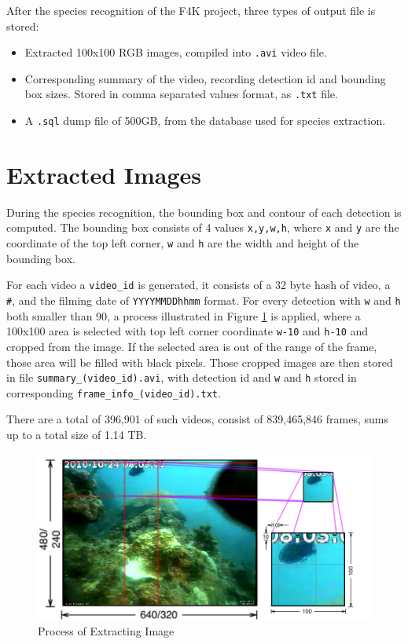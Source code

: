 \documentclass[bsc,logo,twoside,fullspacing,parskip]{infthesis}
\begin{document}
After the species recognition of the F4K project, three types of output file is stored:
\begin{itemize}
\item
Extracted 100x100 RGB images, compiled into {\tt .avi} video file.
\item
Corresponding summary of the video, recording detection id and bounding box sizes. Stored in comma separated values format, as {\tt .txt} file.
\item
A {\tt .sql} dump file of 500GB, from the database used for species extraction.
\end{itemize}

\section{Extracted Images}
\label{sec:summaries}

During the species recognition, the bounding box and contour of each detection is computed.
The bounding box consists of 4 values {\tt x,y,w,h}, where {\tt x} and {\tt y} are the coordinate of the top left corner, {\tt w} and {\tt h} are the width and height of the bounding box. 

For each video a {\tt video\_id} is generated, it consists of a 32 byte hash of video, a {\tt \#}, and the filming date of {\tt YYYYMMDDhhmm} format. 
For every detection with {\tt w} and {\tt h} both smaller than 90, a process illustrated in Figure \ref{fig:extraction} is applied, where a 100x100 area is selected with top left corner coordinate {\tt w-10} and {\tt h-10} and cropped from the image. 
If the selected area is out of the range of the frame, those area will be filled with black pixels.
Those cropped images are then stored in file {\tt summary\_(video\_id).avi}, with detection id and {\tt w} and {\tt h} stored in corresponding {\tt frame\_info\_(video\_id).txt}.

There are a total of 396,901 of such videos, consist of 839,465,846 frames, sums up to a total size of 1.14 TB.

\begin{figure}
    \centering
    \includegraphics[scale=0.3]{graph/extraction.png}
    \caption{Process of Extracting Image}
    \label{fig:extraction}
\end{figure}
\end{document}

